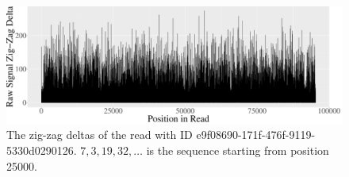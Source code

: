 \begin{figure}
\centering
\includegraphics[scale=0.31]{plots/reads.e9f08690-171f-476f-9119-5330d0290126.raw.delta.zigzag.pdf}
	\caption[The zig-zag deltas of the read with ID e9f08690-171f-476f-9119-5330d0290126.]{\label{fig:read-e9f-zd}The zig-zag deltas of the read with ID e9f08690-171f-476f-9119-5330d0290126. $7, 3, 19, 32,\dots$ is the sequence starting from position 25000.}
\end{figure}
